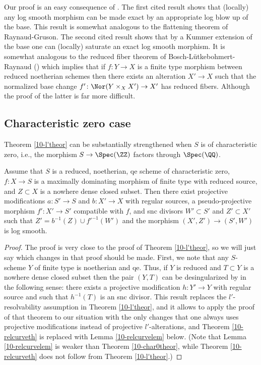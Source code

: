 \documentclass[10pt]{../fichiers-configuration-latex/smfart}
\begin{document}
\begin{remark2}
Our proof is an easy consequence of \cite[A.4.4 and A.4.3]{IKN@Quasi-unipotent}. The first cited
result shows that (locally) any log smooth morphism can be made exact by an appropriate log blow
up of the base. This result is somewhat analogous to the flattening theorem of Raynaud-Gruson.
The second cited result shows that by a Kummer extension of the base one can (locally) saturate
an exact log smooth morphism. It is somewhat analogous to the reduced fiber theorem of Bosch-L\"utkebohmert-Raynaud
(\cite{BLR@Reduced_Fiber}) which implies that if $f{\colon}Y\to X$ is a finite type morphism between
reduced noetherian schemes then there exists an alteration $X'\to X$ such that the normalized base
change $f'{\colon}\Nor(Y\times_XX')\to X'$ has reduced fibers. Although the proof of the latter is
far more difficult.
\end{remark2}

\subsection{Characteristic zero case}\label{10-char0sec} Theorem \ref{10-l'theor} can be substantially
strengthened when $S$ is of characteristic zero, i.e., the morphism $S\to\Spec(\ZZ)$ factors through $\Spec(\QQ)$.

\begin{theorem}\label{10-char0theor}
Assume that $S$ is a reduced, noetherian, qe scheme of characteristic zero, $f{\colon}X\to S$
is a maximally dominating morphism of finite type with reduced source, and $Z\subset X$ is a
nowhere dense closed subset. Then there exist projective modifications $a{\colon}S'\to S$ and
$b{\colon}X'\to X$ with regular sources, a pseudo-projective morphism $f'{\colon}X'\to S'$
compatible with $f$, and snc divisors $W'\subset S'$ and $Z'\subset X'$ such that
$Z'=b^{-1}(Z)\cup f'^{-1}(W')$ and the morphism $(X',Z')\to(S',W')$ is log smooth.
\end{theorem}
\begin{proof}
The proof is very close to the proof of Theorem \ref{10-l'theor}, so we will just say which changes
in that proof should be made. First, we note that any $S$-scheme $Y$ of finite type is noetherian and qe.
Thus, if $Y$ is reduced and $T\subset Y$ is a nowhere dense closed subset then the pair $(Y,T)$
can be desingularized by \cite{Temkin@des1} in the following sense: there exists a projective
modification $h{\colon}Y'\to Y$ with regular source and such that $h^{-1}(T)$ is an snc divisor.
This result replaces the $l'$-resolvability assumption in Theorem \ref{10-l'theor}, and it allows
to apply the proof of that theorem to our situation with the only changes that one always uses
projective modifications instead of projective $l'$-alterations, and Theorem \ref{10-relcurveth}
is replaced with Lemma \ref{10-relcurvelem} below. (Note that Lemma \ref{10-relcurvelem}
is weaker than Theorem \ref{10-char0theor}, while Theorem \ref{10-relcurveth} does not follow
from Theorem \ref{10-l'theor}.)
\end{proof}
\end{document}
